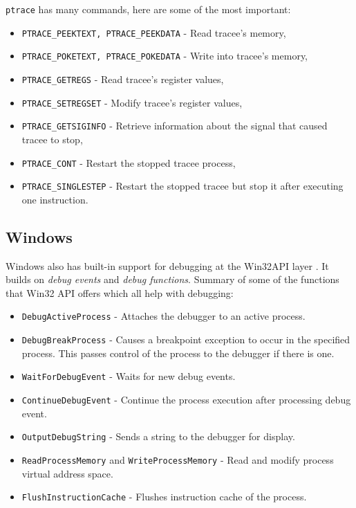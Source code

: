 \texttt{ptrace} has many commands, here are some of the most important:
\begin{itemize}
    \item \texttt{PTRACE_PEEKTEXT, PTRACE_PEEKDATA} - Read tracee's memory,
    \item \texttt{PTRACE_POKETEXT, PTRACE_POKEDATA} - Write into tracee's memory,
    \item \texttt{PTRACE_GETREGS} - Read tracee's register values,
    \item \texttt{PTRACE_SETREGSET} - Modify tracee's register values,
    \item \texttt{PTRACE_GETSIGINFO} - Retrieve information about the signal that caused tracee to stop,
    \item \texttt{PTRACE_CONT} - Restart the stopped tracee process,
    \item \texttt{PTRACE_SINGLESTEP} - Restart the stopped tracee but stop it after executing one instruction.
\end{itemize}


\subsection{Windows}
Windows also has built-in support for debugging at the Win32API layer \cite{windows-msdn-debugging-api, windows-press-debugging-api}.
It builds on \textit{debug events} and \textit{debug functions}. Summary of some of the functions that Win32 API offers which all help with debugging:

\begin{itemize}
    \item \texttt{DebugActiveProcess} - Attaches the debugger to an active process.
    \item \texttt{DebugBreakProcess} - Causes a breakpoint exception to occur in the specified process. 
                                          This passes control of the process to the debugger if there is one.
    \item \texttt{WaitForDebugEvent} - Waits for new debug events.
    \item \texttt{ContinueDebugEvent} - Continue the process execution after processing debug event.
    \item \texttt{OutputDebugString} - Sends a string to the debugger for display.
    \item \texttt{ReadProcessMemory} and \texttt{WriteProcessMemory} - Read and modify process virtual address space.
    \item \texttt{FlushInstructionCache} - Flushes instruction cache of the process.
\end{itemize}

